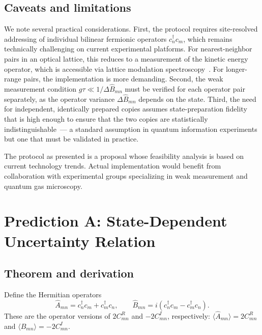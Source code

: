 \documentclass[aps,pra,preprint,groupedaddress,amsmath,amssymb,floatfix]{revtex4-2}
\begin{document}
\subsection{Caveats and limitations}
\label{sec:caveats}

We note several practical considerations. First, the protocol requires site-resolved addressing of individual bilinear fermionic operators $c^\dagger_n c_m$, which remains technically challenging on current experimental platforms. For nearest-neighbor pairs in an optical lattice, this reduces to a measurement of the kinetic energy operator, which is accessible via lattice modulation spectroscopy~\cite{karch2024}. For longer-range pairs, the implementation is more demanding. Second, the weak measurement condition $g\tau \ll 1/\Delta\hat{B}_{mn}$ must be verified for each operator pair separately, as the operator variance $\Delta\hat{B}_{mn}$ depends on the state. Third, the need for independent, identically prepared copies assumes state-preparation fidelity that is high enough to ensure that the two copies are statistically indistinguishable~--- a standard assumption in quantum information experiments but one that must be validated in practice.

The protocol as presented is a proposal whose feasibility analysis is based on current technology trends. Actual implementation would benefit from collaboration with experimental groups specializing in weak measurement and quantum gas microscopy.

\section{Prediction A: State-Dependent Uncertainty Relation}

\subsection{Theorem and derivation}

Define the Hermitian operators
\begin{equation}
\hat{A}_{mn} = c^\dagger_n c_m + c^\dagger_m c_n,
\qquad
\hat{B}_{mn} = i(c^\dagger_n c_m - c^\dagger_m c_n).
\end{equation}
These are the operator versions of $2C^R_{mn}$ and $-2C^I_{mn}$, respectively: $\langle \hat{A}_{mn} \rangle = 2 C^R_{mn}$ and $\langle \hat{B}_{mn} \rangle = -2 C^I_{mn}$.
\end{document}
